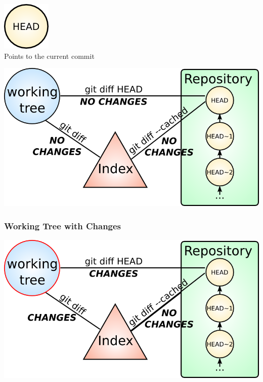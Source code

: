 
\begin{frame}

  \begin{center}
    \includegraphics[width=.25\textwidth]{images/git-head.png}\\\vspacing
    \Large{Points to the current commit}
  \end{center}
\end{frame}


\begin{frame}[plain]

  \begin{center}
    \includegraphics[width=1.0\textwidth]{images/git-diffs.png}
  \end{center}
\end{frame}


\begin{frame}
  \frametitle{Working Tree with Changes}

  \begin{center}
    \includegraphics[width=1.0\textwidth]{images/git-diffs-changes.png}
  \end{center}
\end{frame}

